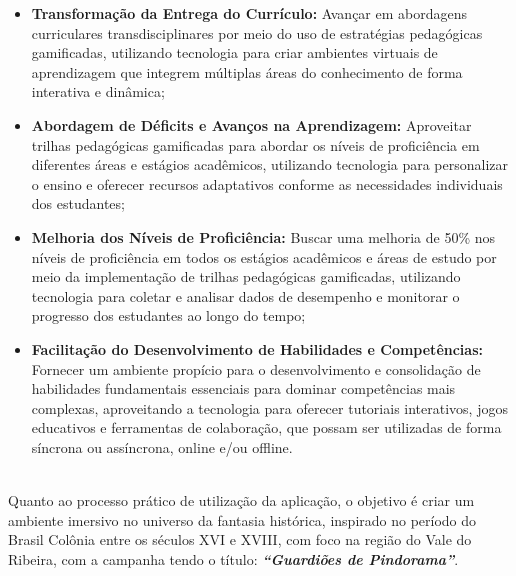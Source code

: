 \begin{itemize}
\\
  \item \textbf{Transformação da Entrega do Currículo:} Avançar em abordagens curriculares transdisciplinares por meio do uso de estratégias pedagógicas gamificadas, utilizando tecnologia para criar ambientes virtuais de aprendizagem que integrem múltiplas áreas do conhecimento de forma interativa e dinâmica; 
\\
  \item \textbf{Abordagem de Déficits e Avanços na Aprendizagem:} Aproveitar trilhas pedagógicas gamificadas para abordar os níveis de proficiência em diferentes áreas e estágios acadêmicos, utilizando tecnologia para personalizar o ensino e oferecer recursos adaptativos conforme as necessidades individuais dos estudantes;
\\
  \item \textbf{Melhoria dos Níveis de Proficiência:} Buscar uma melhoria de 50\% nos níveis de proficiência em todos os estágios acadêmicos e áreas de estudo por meio da implementação de trilhas pedagógicas gamificadas, utilizando tecnologia para coletar e analisar dados de desempenho e monitorar o progresso dos estudantes ao longo do tempo; 
\\
  \item \textbf{Facilitação do Desenvolvimento de Habilidades e Competências:} Fornecer um ambiente propício para o desenvolvimento e consolidação de habilidades fundamentais essenciais para dominar competências mais complexas, aproveitando a tecnologia para oferecer tutoriais interativos, jogos educativos e ferramentas de colaboração, que possam ser utilizadas de forma síncrona ou assíncrona, online e/ou offline.
\\
\end{itemize}
\\

Quanto ao processo prático de utilização da aplicação, o objetivo é criar um ambiente imersivo no universo da fantasia histórica, inspirado no período do Brasil Colônia entre os séculos XVI e XVIII, com foco na região do Vale do Ribeira, com a campanha tendo o título: \textit{\textbf{“Guardiões de  Pindorama”}}.
\\

